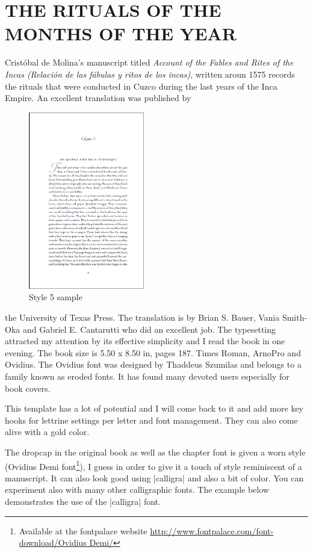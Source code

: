 \chapter{THE RITUALS OF THE MONTHS OF THE YEAR}
\renewcommand{\DefaultLhang}{0.1}
\renewcommand{\LettrineFontHook}{\calligra}
\setlength{\DefaultFindent}{9.5pt}
\setlength{\DefaultNindent}{0pt}
\renewcommand{\LettrineFontHook}{\ovidius}
\lettrine[loversize=0.6]{\textcolor{thegray!60}{C}}{}rist\'obal de Molina’s manuscript titled \emph{Account of the Fables and Rites of the Incas (Relación
de las fábulas y ritos de los incas)}, written aroun 1575 records the rituals that were conducted in Cuzco during the last years of the Inca Empire. An excellent translation was published by
\begin{figure}[ht]
\centering
\includegraphics[width=0.45\textwidth]{./chapters/chapter06.png}
\caption{Style 5 sample}
\end{figure}
the University of Texas Press. The translation is by Brian S. Bauer, Vania Smith-Oka and Gabriel E. Cantarutti who did an excellent job. The typesetting attracted my attention by its effective simplicity and I read the book in one evening. The book size is 5.50 x 8.50 in, pages 187. Times Roman, ArnoPro and Ovidius. The Ovidius font was designed by  Thaddeus Szumilas and 
belongs to a family known as eroded fonts. It has found many devoted users especially for book covers.

This template has a lot of potential and I will come back to it and add more key hooks for lettrine settings per letter and font management. They can also come alive with a gold color.

The dropcap in the original book as well as the chapter font is given a worn style (Ovidius Demi font\footnote{Available at the fontpalace website \protect\url{http://www.fontpalace.com/font-download/Ovidius Demi/}}), I guess in order to give it a touch of style reminiscent of a manuscript. It can also look
good using |calligra| and also a bit of color. You can experiment also with many other calligraphic fonts. The example below demonstrates the use of the |calligra| font.
\bigskip

